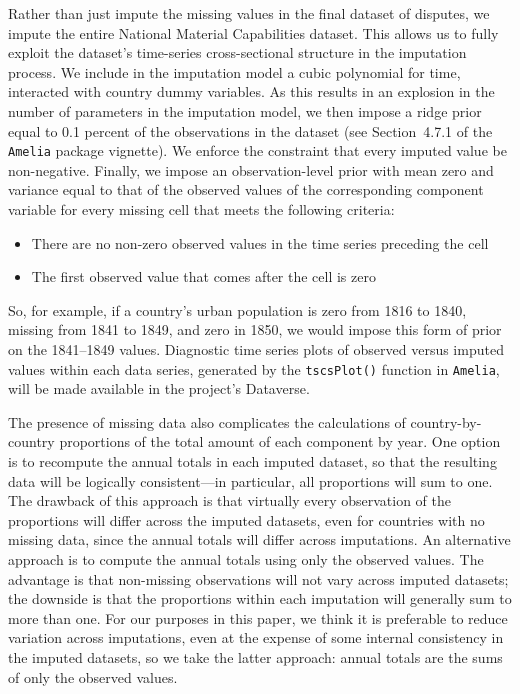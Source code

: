 Rather than just impute the missing values in the final dataset of disputes, we impute the entire National Material Capabilities dataset.
This allows us to fully exploit the dataset's time-series cross-sectional structure in the imputation process.
We include in the imputation model a cubic polynomial for time, interacted with country dummy variables.
As this results in an explosion in the number of parameters in the imputation model, we then impose a ridge prior equal to 0.1 percent of the observations in the dataset (see Section~4.7.1 of the \texttt{Amelia} package vignette).
We enforce the constraint that every imputed value be non-negative.
Finally, we impose an observation-level prior with mean zero and variance equal to that of the observed values of the corresponding component variable for every missing cell that meets the following criteria:
\begin{itemize}
  \item There are no non-zero observed values in the time series preceding the cell
  \item The first observed value that comes after the cell is zero
\end{itemize}
So, for example, if a country's urban population is zero from 1816 to 1840, missing from 1841 to 1849, and zero in 1850, we would impose this form of prior on the 1841--1849 values.
Diagnostic time series plots of observed versus imputed values within each data series, generated by the \texttt{tscsPlot()} function in \texttt{Amelia}, will be made available in the project's Dataverse.

The presence of missing data also complicates the calculations of country-by-country proportions of the total amount of each component by year.
One option is to recompute the annual totals in each imputed dataset, so that the resulting data will be logically consistent---in particular, all proportions will sum to one.
The drawback of this approach is that virtually every observation of the proportions will differ across the imputed datasets, even for countries with no missing data, since the annual totals will differ across imputations.
An alternative approach is to compute the annual totals using only the observed values.
The advantage is that non-missing observations will not vary across imputed datasets; the downside is that the proportions within each imputation will generally sum to more than one.
For our purposes in this paper, we think it is preferable to reduce variation across imputations, even at the expense of some internal consistency in the imputed datasets, so we take the latter approach: annual totals are the sums of only the observed values.

